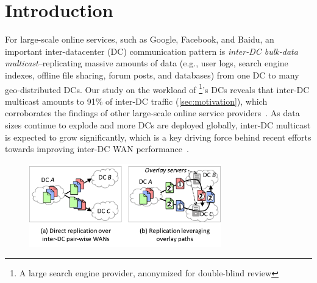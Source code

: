 \section{Introduction}

For large-scale online services, such as Google, Facebook, and
Baidu, an important inter-datacenter (DC) communication pattern is
{\em inter-DC bulk-data multicast}--replicating massive amounts of data
(e.g., user logs, search engine indexes, offline file sharing,
forum posts, and databases)
from one DC to many geo-distributed DCs.
Our study on the workload of 
\company\footnote{A large search engine provider, anonymized for
double-blind review}'s DCs reveals that
inter-DC multicast amounts to 91\% of inter-DC traffic
(\Section\ref{sec:motivation}), which corroborates the findings of
other large-scale online service providers~\cite{kumar2015bwe,zhang2016piebridge}.
As data sizes continue to explode and more DCs are deployed
globally, inter-DC multicast is expected
to grow significantly, which is a key driving force behind
recent efforts towards improving inter-DC WAN 
performance~\cite{savage1999Theend,jain2013b4,kumar2015bwe,hong2013achieving,zhang2015guarantee}.




\begin{figure}[t!]
\includegraphics[width=83mm]{images/intro-example.pdf}
\vspace{-0.4cm}
\label{fig:intro}
\vspace{-0.4cm}
\end{figure}

